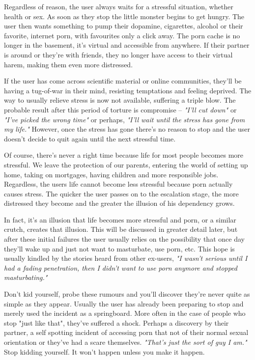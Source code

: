 \documentclass[easypeasy.tex]{subfiles}
\begin{document}
Regardless of reason, the user always waits for a stressful situation, whether health or sex. As soon as they stop the little monster begins to get hungry. The user then wants something to pump their dopamine, cigarettes, alcohol or their favorite, internet porn, with favourites only a click away. The porn cache is no longer in the basement, it's virtual and accessible from anywhere. If their partner is around or they're with friends, they no longer have access to their virtual harem, making them even more distressed.

If the user has come across scientific material or online communities, they'll be having a tug-of-war in their mind, resisting temptations and feeling deprived. The way to usually relieve stress is now not available, suffering a triple blow. The probable result after this period of torture is compromise -- \textit{"I'll cut down"} or \textit{"I've picked the wrong time"} or perhaps, \textit{"I'll wait until the stress has gone from my life."} However, once the stress has gone there's no reason to stop and the user doesn't decide to quit again until the next stressful time.

Of course, there's never a right time because life for most people becomes more stressful. We leave the protection of our parents, entering the world of setting up home, taking on mortgages, having children and more responsible jobs. Regardless, the users life cannot become less stressful because porn actually causes stress. The quicker the user passes on to the escalation stage, the more distressed they become and the greater the illusion of his dependency grows.

In fact, it's an illusion that life becomes more stressful and porn, or a similar crutch, creates that illusion. This will be discussed in greater detail later, but after these initial failures the user usually relies on the possibility that once day they'll wake up and just not want to masturbate, use porn, etc. This hope is usually kindled by the stories heard from other ex-users, \textit{"I wasn't serious until I had a fading penetration, then I didn't want to use porn anymore and stopped masturbating."}

Don't kid yourself, probe these rumours and you'll discover they're never quite as simple as they appear. Usually the user has already been preparing to stop and merely used the incident as a springboard. More often in the case of people who stop "just like that", they've suffered a shock. Perhaps a discovery by their partner, a self spotting incident of accessing porn that not of their normal sexual orientation or they've had a scare themselves. \textit{"That's just the sort of guy I am."} Stop kidding yourself. It won't happen unless you make it happen.
\end{document}
